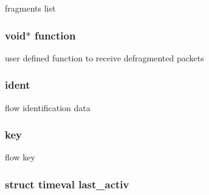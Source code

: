 fragments list 

\hypertarget{structntoh__ipv6__flow__t_aea3dcf0c8de30d192ee92494131c4996}{
\subsubsection[{function}]{\setlength{\rightskip}{0pt plus 5cm}void$\ast$ function}}\label{structntoh__ipv6__flow__t_aea3dcf0c8de30d192ee92494131c4996}


user defined function to receive defragmented packets 

\hypertarget{structntoh__ipv6__flow__t_ae6f21eaeed6948ec645d7d94a37c3140}{
\subsubsection[{ident}]{ ident}}\label{structntoh__ipv6__flow__t_ae6f21eaeed6948ec645d7d94a37c3140}


flow identification data 

\hypertarget{structntoh__ipv6__flow__t_a8c3b4b46820e7d3e3af76db78a1dbb3e}{
\subsubsection[{key}]{ key}}\label{structntoh__ipv6__flow__t_a8c3b4b46820e7d3e3af76db78a1dbb3e}


flow key 

\hypertarget{structntoh__ipv6__flow__t_a9d115049a50ba4e69eb04c23c973a4a2}{
\subsubsection[{last\-\_\-activ}]{\setlength{\rightskip}{0pt plus 5cm}struct timeval last\-\_\-activ}}\label{structntoh__ipv6__flow__t_a9d115049a50ba4e69eb04c23c973a4a2}


